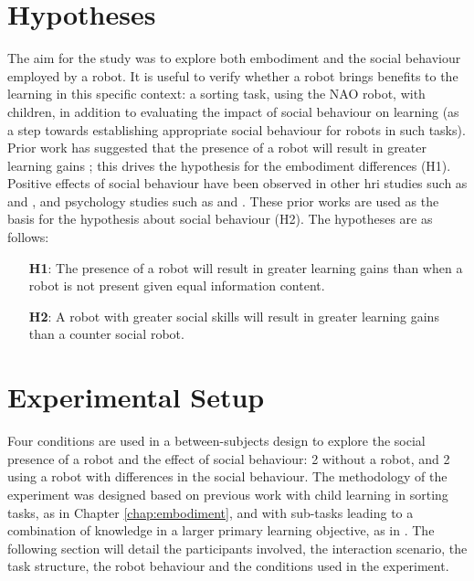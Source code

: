 \section{Hypotheses}\label{sec:socasoc-hyp}
The aim for the study was to explore both embodiment and the social behaviour employed by a robot. It is useful to verify whether a robot brings benefits to the \gls{learning} in this specific context: a sorting task, using the NAO robot, with children, in addition to evaluating the impact of social behaviour on \gls{learning} (as a step towards establishing appropriate social behaviour for robots in such tasks). Prior work has suggested that the presence of a robot will result in greater learning gains \citep{han2005educational, leyzberg2012physical}; this drives the hypothesis for the embodiment differences (H1). Positive effects of social behaviour have been observed in other \acrshort{hri} studies such as \citet{leyzberg2014personalizing} and \citet{saerbeck2010expressive}, and psychology studies such as \citet{atkinson2005fostering} and \citet{mayer2004personalization}. These prior works are used as the basis for the hypothesis about social behaviour (H2). The hypotheses are as follows:
\begin{enumerate}
	\item[\textbf{H1}:] The presence of a robot will result in greater \gls{learning} gains than when a robot is not present given equal information content.
	\item[\textbf{H2}:] A robot with greater social skills will result in greater \gls{learning} gains than a counter social robot.
\end{enumerate}

\section{Experimental Setup}\label{sec:social-setup}
Four conditions are used in a between-subjects design to explore the social presence of a robot and the effect of social behaviour: 2 without a robot, and 2 using a robot with differences in the social behaviour. The methodology of the experiment was designed based on previous work with child \gls{learning} in sorting tasks, as in Chapter \ref{chap:embodiment}, and with sub-tasks leading to a combination of knowledge in a larger primary \gls{learning} objective, as in \citet{leyzberg2014personalizing}. The following section will detail the participants involved, the interaction scenario, the task structure, the robot behaviour and the conditions used in the experiment.

